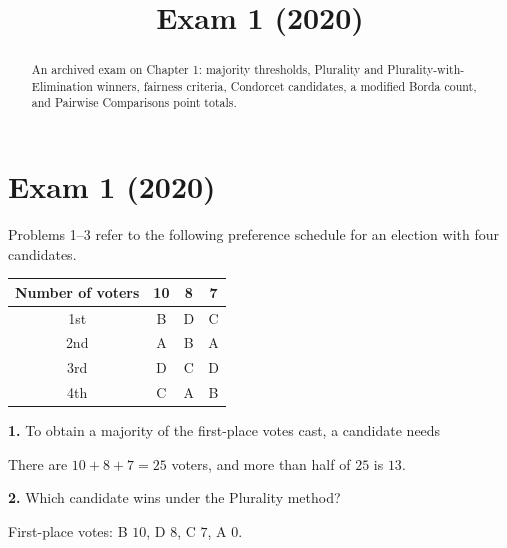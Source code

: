\documentclass[12pt]{ximera}
\title{Exam 1 (2020)}
\begin{document}
\begin{abstract}
An archived exam on Chapter 1: majority thresholds, Plurality and Plurality-with-Elimination winners, fairness criteria, Condorcet candidates, a modified Borda count, and Pairwise Comparisons point totals.
\end{abstract}
\maketitle

\section*{Exam 1 (2020)}

\begin{problem}
Problems 1--3 refer to the following preference schedule for an election with four
candidates.
\begin{center}
\begin{tabular}{c|ccc}
Number of voters & 10 & 8 & 7\\\hline
1st & B & D & C\\
2nd & A & B & A\\
3rd & D & C & D\\
4th & C & A & B
\end{tabular}
\end{center}

\begin{prompt}
\textbf{1.} To obtain a majority of the first-place votes cast, a candidate needs

\begin{multipleChoice}
\end{multipleChoice}

\begin{feedback}
There are $10+8+7=25$ voters, and more than half of $25$ is $13$.
\end{feedback}
\end{prompt}

\begin{prompt}
\textbf{2.} Which candidate wins under the Plurality method?

\begin{multipleChoice}
\end{multipleChoice}

\begin{feedback}
First-place votes: B $10$, D $8$, C $7$, A $0$.
\end{feedback}
\end{prompt}


\end{problem}
\end{document}
